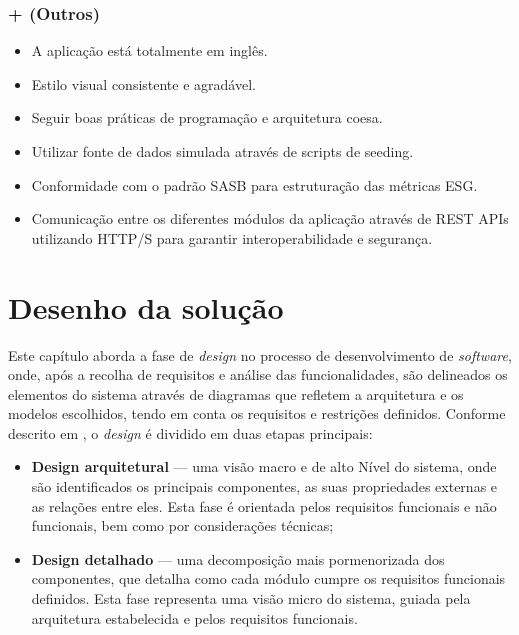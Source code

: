 \subsection{+ (Outros)}
\begin{itemize}
    \item A aplicação está totalmente em inglês.
    \item Estilo visual consistente e agradável.
    \item Seguir boas práticas de programação e arquitetura coesa.
    \item Utilizar fonte de dados simulada através de scripts de seeding.
    \item Conformidade com o padrão \gls{SASB} para estruturação das métricas \gls{ESG}.
    \item Comunicação entre os diferentes módulos da aplicação através de REST APIs utilizando HTTP/S para garantir interoperabilidade e segurança.
\end{itemize}


\chapter{Desenho da solução}
\label{ch:DS}

Este capítulo aborda a fase de \textit{design} no processo de desenvolvimento de \textit{software}, onde, após a recolha de requisitos e análise das funcionalidades, são delineados os elementos do sistema através de diagramas que refletem a arquitetura e os modelos escolhidos, tendo em conta os requisitos e restrições definidos. Conforme descrito em \cite{tsui2022essentials}, o \textit{design} é dividido em duas etapas principais:

\begin{itemize}
    \item \textbf{Design arquitetural} — uma visão macro e de alto Nível do sistema, onde são identificados os principais componentes, as suas propriedades externas e as relações entre eles. Esta fase é orientada pelos requisitos funcionais e não funcionais, bem como por considerações técnicas;
    \item \textbf{Design detalhado} — uma decomposição mais pormenorizada dos componentes, que detalha como cada módulo cumpre os requisitos funcionais definidos. Esta fase representa uma visão micro do sistema, guiada pela arquitetura estabelecida e pelos requisitos funcionais.
\end{itemize}


